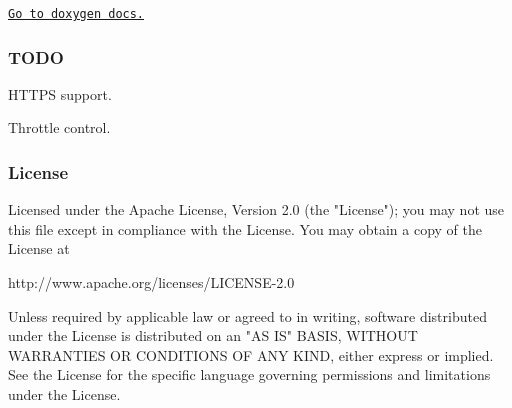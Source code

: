 \href{http://archangelsdy.github.io/QtMockWebServer/docs/html/index.html}{\tt Go to doxygen docs.}

\subsubsection*{T\+O\+D\+O}


\begin{DoxyItemize}
\item H\+T\+T\+P\+S support.
\item Throttle control.
\end{DoxyItemize}

\subsubsection*{License}

\begin{DoxyVerb}Licensed under the Apache License, Version 2.0 (the "License");
you may not use this file except in compliance with the License.
You may obtain a copy of the License at

   http://www.apache.org/licenses/LICENSE-2.0

Unless required by applicable law or agreed to in writing, software
distributed under the License is distributed on an "AS IS" BASIS,
WITHOUT WARRANTIES OR CONDITIONS OF ANY KIND, either express or implied.
See the License for the specific language governing permissions and
limitations under the License.\end{DoxyVerb}
 
